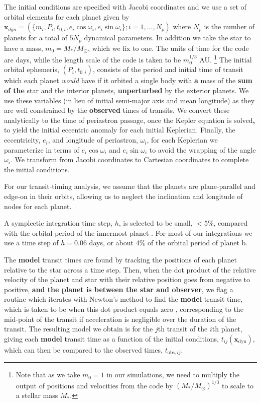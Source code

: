 \documentclass[twocolumn]{aastex63}
\begin{document}
The initial conditions are specified with Jacobi coordinates \textbf{\citep{Hamers2016}} and
we use a set of orbital elements for each planet given by
$\mathbf{x}_{dyn} = (\{m_i,P_i,t_{0,i},e_i \cos{\omega_i},e_i\sin{\omega_i}\}; i = 1,...,N_p)$
where $N_p$ is the number of planets for a total of $5N_p$ dynamical parameters. In
addition we take the star to have a mass, $m_0 = M_*/M_\odot$, which we fix to one.
The units of time for the code are days, while the length scale of the code is taken to be $m_0^{1/3}$ AU. \footnote{Note that as we take $m_0=1$ in our simulations, we need to multiply
    the output of positions and velocities from the code by $(M_*/M_\odot)^{1/3}$ to scale to a stellar mass $M_*$.}
The initial orbital ephemeris, $(P_i,t_{0,i})$, consists of the period and initial time of
transit which each planet {\it would} have if it orbited a single
body with \textbf{a} mass of the \textbf{sum of the} star and the interior planets, 
\textbf{unperturbed} by the exterior planets.  We use these variables (in lieu of initial semi-major axis and mean longitude) as
they are well constrained by the \textbf{observed} times of transits.  We convert
these analytically to the time of periastron passage, once the
Kepler equation is solved\textbf{,} to yield the initial eccentric anomaly
for each initial Keplerian.  Finally, the eccentricity, $e_i$, and
longitude of periastron, $\omega_i$, for each Keplerian we
parameterize in terms of $e_i\cos{\omega_i}$ and $e_i\sin{\omega_i}$
to avoid the wrapping of the angle $\omega_i$.   We transform from Jacobi coordinates to Cartesian coordinates to complete the initial conditions.

For our transit-timing analysis, we assume that the planets are
plane-parallel and edge-on in their orbits, allowing us to neglect
the inclination and longitude of nodes for each planet.

A symplectic integration time step, $h$, is selected to be small,
${<} 5$\%, compared with the orbital period of the innermost planet
\citep{Wisdom1991}. For most of our integrations we use a time step
of $h=0.06$ days, or about 4\% of the orbital period of planet b.

The \textbf{model} transit times are found by tracking the positions of each
planet relative to the star across a time step.  Then, when the
dot product of the relative velocity of the planet and star
with their relative position goes from negative to positive, \textbf{and
the planet is between the star and observer},
we flag a routine which iterates with Newton's method to find
the \textbf{model} transit time, which is taken to be when this dot product
equals zero \citep{Fabrycky2010}, corresponding to the mid-point
of the transit if acceleration is negligible over the duration of the
transit.  The resulting model we obtain
is for the $j$th transit of the $i$th planet, giving each \textbf{model}
transit time as a function of the initial conditions, $t_{ij}(\mathbf{x}_\mathrm{dyn})$, which can then be compared to the observed times, $t_{\mathrm{obs},ij}$.
\end{document}
